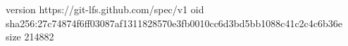 version https://git-lfs.github.com/spec/v1
oid sha256:27c74874f6ff03087af1311828570e3fb0010cc6d3bd5bb1088c41c2c4c6b36e
size 214882
